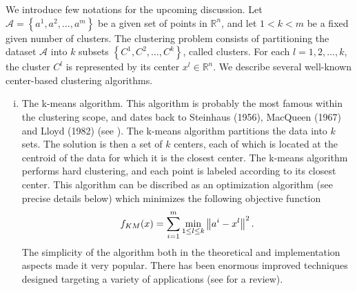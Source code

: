 We introduce few notations for the upcoming discussion. Let $\mathcal{A}= \left\lbrace a^1, a^2, \ldots ,a^m \right\rbrace$ be a given set of points in $\mathbb{R}^n$, and let $1 < k < m$ be a fixed given number of clusters. The clustering problem consists of partitioning the dataset $\mathcal{A}$ into $k$ subsets $\left\lbrace C^1, C^2, \ldots ,C^k \right\rbrace$, called clusters. For each $l=1, 2, \ldots ,k$, the cluster $C^l$ is represented by its center $x^l \in \mathbb{R}^n$. We describe several well-known center-based clustering algorithms.
\begin{enumerate}[(i)]
	\item The k-means algorithm. This algorithm is probably the most famous within the clustering scope, and dates back to Steinhaus (1956), MacQueen (1967) and Lloyd (1982) (see \cite{S1956,M1967,L1982}). The k-means algorithm partitions the data into $k$ sets. The solution is then a set of $k$ centers, each of which is located at the centroid of the data for which it is the closest center. The k-means algorithm performs hard clustering, and each point is labeled according to its closest center. This algorithm can be discribed as an optimization algorithm (see precise details below) which minimizes the following objective function
	\begin{equation*}
		f_{KM}(x) = \sum\limits_{i=1}^{m}\min\limits_{1 \le l \le k} \left\Vert {a^i-x^l} \right\Vert^2.
	\end{equation*}
	The simplicity of the algorithm both in the theoretical and implementation aspects made it very popular. There has been enormous improved techniques designed targeting a variety of applications (see \cite{JMF1999} for a review).
	

\end{enumerate}
